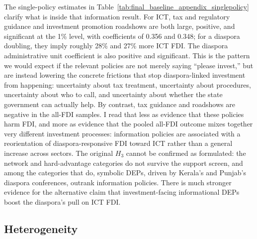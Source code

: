 \documentclass[12pt]{article}
\begin{document}
The single-policy estimates in Table~\ref{tab:final_baseline_appendix_singlepolicy} clarify what is inside that information result. For ICT, tax and regulatory guidance and investment promotion roadshows are both large, positive, and significant at the 1\% level, with coefficients of 0.356 and 0.348; for a diaspora doubling, they imply roughly 28\% and 27\% more ICT FDI. The diaspora administrative unit coefficient is also positive and significant. This is the pattern we would expect if the relevant policies are not merely saying ``please invest,'' but are instead lowering the concrete frictions that stop diaspora-linked investment from happening: uncertainty about tax treatment, uncertainty about procedures, uncertainty about who to call, and uncertainty about whether the state government can actually help. By contrast, tax guidance and roadshows are negative in the all-FDI samples. I read that less as evidence that these policies harm FDI, and more as evidence that the pooled all-FDI outcome mixes together very different investment processes: information policies are associated with a reorientation of diaspora-responsive FDI toward ICT rather than a general increase across sectors. The original $H_3$ cannot be confirmed as formulated: the network and hard-advantage categories do not survive the support screen, and among the categories that do, symbolic DEPs, driven by Kerala's and Punjab's diaspora conferences, outrank information policies. There is much stronger evidence for the alternative claim that investment-facing informational DEPs boost the diaspora's pull on ICT FDI.



\subsection{Heterogeneity}
\end{document}
